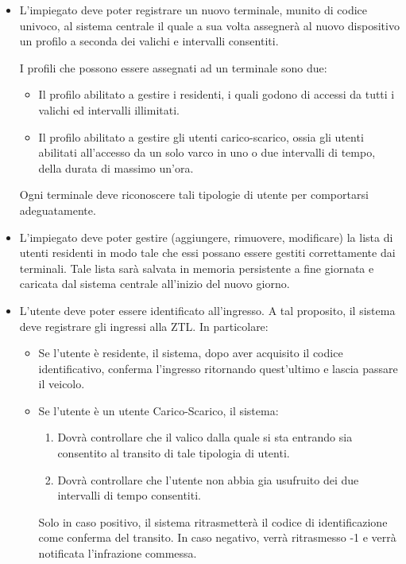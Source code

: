 \documentclass[12pt, letterpaper]{article}
\begin{document}
\begin{itemize}
    \item L'impiegato deve poter registrare un nuovo terminale, munito di codice univoco, al sistema centrale il quale a sua volta assegnerà al nuovo dispositivo un profilo a seconda dei valichi e intervalli consentiti.
    
    I profili che possono essere assegnati ad un terminale sono due: 
    \begin{itemize}
        \item Il profilo abilitato a gestire i residenti, i quali godono di accessi da tutti i valichi ed intervalli illimitati.
        \item Il profilo abilitato a gestire gli utenti carico-scarico, ossia gli utenti abilitati all'accesso da un solo varco in uno o due intervalli di tempo, della durata di massimo un'ora.
    \end{itemize}
    Ogni terminale deve riconoscere tali tipologie di utente per comportarsi adeguatamente.
    \item L'impiegato deve poter gestire (aggiungere, rimuovere, modificare) la lista di utenti residenti in modo tale che essi possano essere gestiti correttamente dai terminali. Tale lista sarà salvata in memoria persistente a fine giornata e caricata dal sistema centrale all'inizio del nuovo giorno.
    \item L'utente deve poter essere identificato all'ingresso. A tal proposito, il sistema deve registrare gli ingressi alla ZTL. In particolare:
    \begin{itemize}
        \item Se l'utente è residente, il sistema, dopo aver acquisito il codice identificativo, conferma l'ingresso ritornando quest'ultimo e lascia passare il veicolo.
        \item Se l'utente è un utente Carico-Scarico, il sistema:
        \begin{enumerate}
            \item Dovrà controllare che il valico dalla quale si sta entrando sia consentito al transito di tale tipologia di utenti.
            \item Dovrà controllare che l'utente non abbia gia usufruito dei due intervalli di tempo consentiti.
        \end{enumerate}
        Solo in caso positivo, il sistema ritrasmetterà il codice di identificazione come conferma del transito.
        In caso negativo, verrà ritrasmesso -1 e verrà notificata l'infrazione commessa.

\end{itemize}
\end{itemize}
\end{document}
